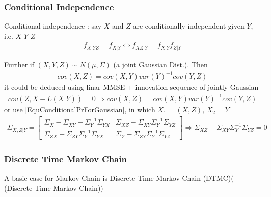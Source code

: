     
    
    
    

    




    



\subsubsection{Conditional Independence}
Conditional independence : say $ X $ and $ Z $ are conditionally independent given $ Y $, i.e. $ X $-$ Y $-$ Z $
\begin{align*}
    f_{X|YZ}=f_{X|Y}\Leftrightarrow f_{XZ|Y}=f_{X|Y}f_{Z|Y} 
\end{align*}

Further if $ (X,Y,Z)\sim N(\mu ,\Sigma ) $ (a joint Gaussian Dist.). Then
\begin{align*}
    cov(X,Z)=cov(X,Y)var(Y)^{-1}cov(Y,Z)
\end{align*}
it could be deduced using linar MMSE + innovation sequence of jointly Gaussian
\begin{align*}
    cov(Z,X-L(X|Y))=0\Rightarrow cov(X,Z)= cov(X,Y)var(Y)^{-1}cov(Y,Z)
\end{align*}
or use \autoref{EquConditionalPrForGaussian}, in which $ X_1=(X,Z),\,X_2=Y $
\begin{align*}
    \Sigma _{X,Z|Y}=\begin{bmatrix}
        \Sigma _{X}-\Sigma _{XY}-\Sigma _{Y}^{-1}\Sigma _{YX}&\Sigma _{XZ}-\Sigma _{XY}\Sigma _{Y}^{-1}\Sigma _{YZ}\\
        \Sigma _{ZX}-\Sigma _{ZY}\Sigma _Y^{-1}\Sigma _{YX}&\Sigma _{Z}-\Sigma _{ZY}\Sigma _Y^{-1}\Sigma _{YZ}
    \end{bmatrix} \Rightarrow \Sigma _{XZ}-\Sigma _{XY}\Sigma _{Y}^{-1}\Sigma _{YZ}=0
\end{align*}





\subsubsection{Discrete Time Markov Chain}\label{SubSubSectionDTMC}
A basic case for Markov Chain is Discrete Time Markov Chain (DTMC)( (Discrete Time Markov Chain))


